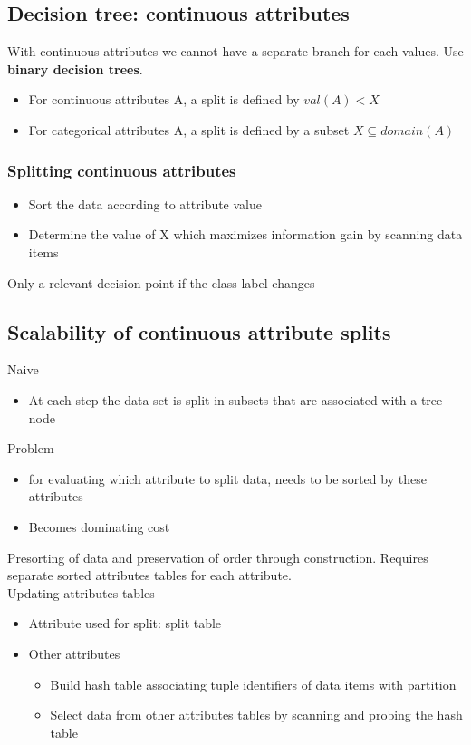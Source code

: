 \subsection{Decision tree: continuous attributes}
With continuous attributes we cannot have a separate branch for each
values. Use \textbf{binary decision trees}.
\begin{itemize}
\item For continuous attributes A, a split is defined by $ val(A) < X
  $
\item For categorical attributes A, a split is defined by a subset $ X
  \subseteq domain(A) $
\end{itemize}

\subsubsection{Splitting continuous attributes}
\begin{itemize}
\item Sort the data according to attribute value
\item Determine the value of X which maximizes information gain by
  scanning data items
\end{itemize}
Only a relevant decision point if the class label changes

\subsection{Scalability of continuous attribute splits}
Naive
\begin{itemize}
\item At each step the data set is split in subsets that are
  associated with a tree node
\end{itemize}
Problem
\begin{itemize}
\item for evaluating which attribute to split data, needs to be sorted
  by these attributes
\item Becomes dominating cost
\end{itemize}

Presorting of data and preservation of order through
construction. Requires separate sorted attributes tables for each
attribute. \\
Updating attributes tables
\begin{itemize}
\item Attribute used for split: split table
\item Other attributes
  \begin{itemize}
  \item Build hash table associating tuple identifiers of data items
    with partition
  \item Select data from other attributes tables by scanning and
    probing the hash table
  \end{itemize}
\end{itemize}

